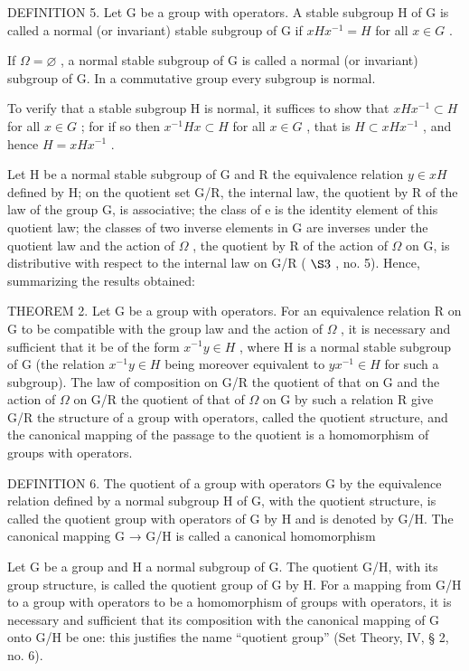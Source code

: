 DEFINITION 5. Let G be a group with operators. A stable subgroup H of G is called a normal (or invariant) stable subgroup of G if \(xHx^{-1} = H\) for all \(x \in G\) .

If \(\Omega = \varnothing\) , a normal stable subgroup of G is called a normal (or invariant) subgroup of G. In a commutative group every subgroup is normal.

To verify that a stable subgroup H is normal, it suffices to show that \(xHx^{-1} \subset H\) for all \(x \in G\) ; for if so then \(x^{-1}Hx \subset H\) for all \(x \in G\) , that is \(H \subset xHx^{-1}\) , and hence \(H = xHx^{-1}\) .

Let H be a normal stable subgroup of G and R the equivalence relation \(y \in xH\) defined by H; on the quotient set G/R, the internal law, the quotient by R of the law of the group G, is associative; the class of e is the identity element of this quotient law; the classes of two inverse elements in G are inverses under the quotient law and the action of \(\Omega\) , the quotient by R of the action of \(\Omega\) on G, is distributive with respect to the internal law on G/R ( \(\S 3\) , no. 5). Hence, summarizing the results obtained:

THEOREM 2. Let G be a group with operators. For an equivalence relation R on G to be compatible with the group law and the action of \(\Omega\) , it is necessary and sufficient that it be of the form \(x^{-1}y \in H\) , where H is a normal stable subgroup of G (the relation \(x^{-1}y \in H\) being moreover equivalent to \(yx^{-1} \in H\) for such a subgroup). The law of composition on G/R the quotient of that on G and the action of \(\Omega\) on G/R the quotient of that of \(\Omega\) on G by such a relation R give G/R the structure of a group with operators, called the quotient structure, and the canonical mapping of the passage to the quotient is a homomorphism of groups with operators.

DEFINITION 6. The quotient of a group with operators G by the equivalence relation defined by a normal subgroup H of G, with the quotient structure, is called the quotient group with operators of G by H and is denoted by G/H. The canonical mapping G → G/H is called a canonical homomorphism

Let G be a group and H a normal subgroup of G. The quotient G/H, with its group structure, is called the quotient group of G by H. For a mapping from G/H to a group with operators to be a homomorphism of groups with operators, it is necessary and sufficient that its composition with the canonical mapping of G onto G/H be one: this justifies the name ``quotient group'' (Set Theory, IV, § 2, no. 6).

